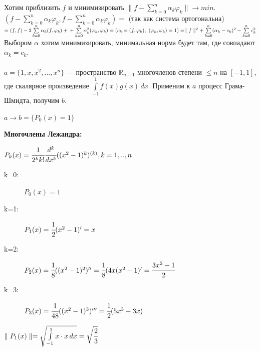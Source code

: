 \documentclass[12pt]{article}
\theoremstyle{definition}
\numberwithin{equation}{section}
\begin{document}
	Хотим приблизить $f$ и минимизировать $\parallel f - \sum\limits_{k=0}^n \alpha_k \varphi_k \parallel \to min$.\\
	$(f - \sum\limits_{k=0}^n \alpha_k \varphi_k, f - \sum\limits_{k=0}^n \alpha_k \varphi_k) =$ (так как система ортогональна) $= (f, f) - 2\sum\limits_{k=0}^n \alpha_k (f, \varphi_k) +\\+\sum\limits_{k=0}^n \alpha_k^2 (\varphi_k, \varphi_k) = (c_k=(f, \varphi_k),~ (\varphi_k, \varphi_k)=1) = \parallel f \parallel^2 + \sum\limits_{k=0}^n (\alpha_k - c_k)^2 - \sum\limits_{k=0}^n c_k^2$\\
	Выбором $\alpha$ хотим минимизировать, минимальная норма будет там, где совпадают $\alpha_k = c_k$.\\
	\\
	$a = \{1, x, x^2,..., x^n\}$ --- пространство $\mathbb{R}_{n+1}$ многочленов степени $\leqslant n$ на $[-1, 1]$, где скалярное произведение $\int\limits_{-1}^1 f(x)g(x)\,dx$. Применим к $a$ процесс Грама-Шмидта, получим $b$.\begin{center}
		$a \to b = \{P_0(x)=1\}$\end{center}
	\textbf{Многочлены Лежандра:} \begin{center}$P_k(x) = \cfrac{1}{2^k k!}\cfrac{d^k}{dx^k}((x^2-1)^k)^{(k)}, k=1,..,n$\end{center}\begin{description} 
		\item[k=0:] $P_0(x)=1$
		\item[k=1:] $P_1(x)=\cfrac{1}{2}(x^2-1)'=x$
		\item[k=2:] $P_2(x)=\cfrac{1}{8}((x^2-1)^2)''=\cfrac{1}{8}(4x(x^2-1)'=\cfrac{3x^2-1}{2}$
		\item[k=3:] $P_3(x)=\cfrac{1}{48}((x^2-1)^3)'''=\cfrac{1}{2}(5x^3-3x)$\end{description}
	$\parallel P_1(x) \parallel = \sqrt{\int\limits_{-1}^1 x \cdot x\,dx} = \sqrt{\cfrac{2}{3}}$\\
	\\
\end{document}
